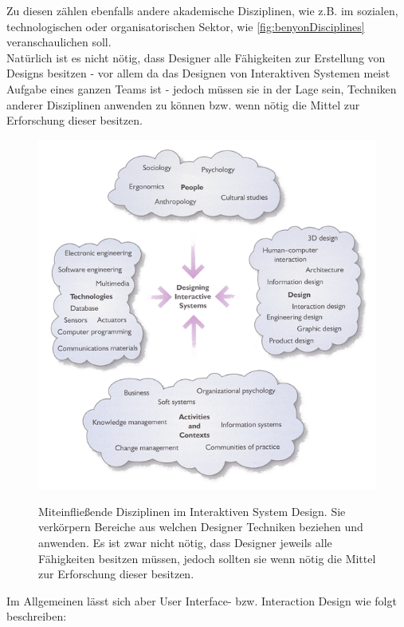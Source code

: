\medskip Zu diesen zählen ebenfalls andere akademische Disziplinen, wie z.B. im sozialen, technologischen oder organisatorischen Sektor, wie \autoref{fig:benyonDisciplines} veranschaulichen soll.\\
Natürlich ist es nicht nötig, dass Designer alle Fähigkeiten zur Erstellung von Designs besitzen - vor allem da das Designen von Interaktiven Systemen meist Aufgabe eines ganzen Teams ist - jedoch müssen sie in der Lage sein, Techniken anderer Disziplinen	anwenden	zu können bzw. wenn nötig die Mittel zur Erforschung dieser besitzen. \citep{Benyon:2005}

\begin{figure}
        {\includegraphics[width=\linewidth]{gfx/benyonDisciplines}}
		\caption[Miteinfließende Disziplinen im Interaktiven System Design \newline \citep{Benyon:2005}]{Miteinfließende Disziplinen im Interaktiven System Design. Sie verkörpern Bereiche aus welchen Designer Techniken beziehen	und anwenden. Es ist zwar nicht nötig, dass Designer jeweils alle Fähigkeiten besitzen müssen, jedoch sollten sie wenn nötig die Mittel zur Erforschung dieser besitzen.}\label{fig:benyonDisciplines}
\end{figure}

\medskip Im Allgemeinen lässt sich aber User Interface- bzw. Interaction Design wie folgt beschreiben:

